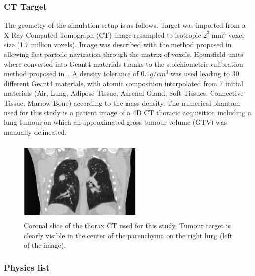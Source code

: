 \documentclass[11pt]{iopart}
\begin{document}
\subsubsection{CT Target}

The geometry of the simulation setup is as follows. Target was
imported from a X-Ray Computed Tomograph (CT) image resampled to
isotropic $2^3$ mm$^3$ voxel size (1.7 million voxels). Image was
described with the method proposed in~\cite{Sarrut2008} allowing fast
particle navigation through the matrix of voxels. Hounsfield units
where converted into Geant4 materials thanks to the stoichiometric
calibration method proposed in~\cite{Schneider2000a}. A density
tolerance of $0.1 g/cm^3$ was used leading to $30$ different Geant4
materials, with atomic composition interpolated from 7 initial
materials (Air, Lung, Adipose Tissue, Adrenal Gland, Soft Tissues,
Connective Tissue, Marrow Bone) according to the mass density. The
numerical phantom used for this study is a patient image of a 4D CT
thoracic acquisition including a lung tumour on which an approximated
gross tumour volume (GTV) was manually delineated.

\begin{figure}[!h]
\centering
\includegraphics[width=6cm,height=40mm]{figures/phantomCT.jpg}
\caption{Coronal slice of the thorax CT used for this study. Tumour
  target is clearly visible in the center of the parenchyma on the
  right lung (left of the image).}
\label{fig00}
\end{figure}

\subsubsection{Physics list}
\end{document}
